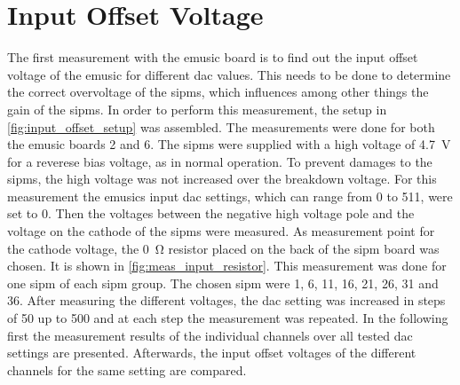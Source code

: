 




\section{Input Offset Voltage}
The first measurement with the \ac{emusic} board is to find out the input offset voltage of the \ac{emusic} for different \ac{dac} values.
This needs to be done to determine the correct overvoltage of the \acp{sipm}, which influences among other things the gain of the \acp{sipm}.
In order to perform this measurement, the setup in \autoref{fig:input_offset_setup} was assembled.
The measurements were done for both the \ac{emusic} boards 2 and 6.
The \acp{sipm} were supplied with a high voltage of \SI{4.7}{\volt} for a reverese bias voltage, as in normal operation.
To prevent damages to the \acp{sipm}, the high voltage was not increased over the breakdown voltage.
For this measurement the \ac{emusic}s input \ac{dac} settings, which can range from 0 to \SI{511}{\dacu}, were set to \SI{0}{\dacu}.
Then the voltages between the negative high voltage pole and the voltage on the cathode of the \acp{sipm} were measured.
As measurement point for the cathode voltage, the \SI{0}{\ohm} resistor placed on the back of the \ac{sipm} board was chosen.
It is shown in \autoref{fig:meas_input_resistor}.
This measurement was done for one \ac{sipm} of each \ac{sipm} group.
The chosen \ac{sipm} were 1, 6, 11, 16, 21, 26, 31 and 36.
After measuring the different voltages, the \ac{dac} setting was increased in steps of \SI{50}{\dacu} up to \SI{500}{\dacu} and at each step the measurement was repeated.
In the following first the measurement results of the individual channels over all tested \ac{dac} settings are presented.
Afterwards, the input offset voltages of the different channels for the same setting are compared.


